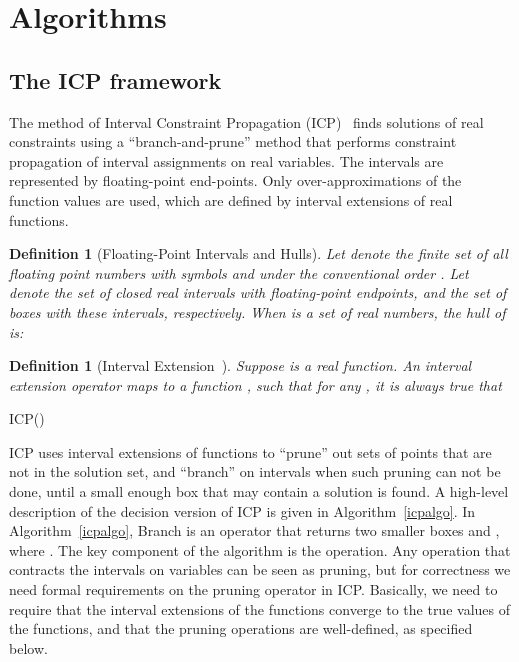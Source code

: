 \documentclass[12pt]{article}
\newtheorem{definition}[theorem]{Definition}
\begin{document}
\section{Algorithms}\label{algorithms}

\subsection{The ICP framework}

The method of Interval Constraint Propagation (ICP)~\cite{handbookICP} finds solutions of real constraints using a ``branch-and-prune'' method that performs constraint propagation of interval assignments on real variables. The intervals are represented by floating-point end-points. Only over-approximations of the function values are used, which are defined by interval extensions of real functions.
\begin{definition}[Floating-Point Intervals and Hulls]
Let  denote the finite set of all floating point numbers with symbols  and  under the conventional order . Let
 denote the set of closed real intervals with floating-point endpoints, and the set of {\em boxes} with these intervals, respectively. When  is a set of real numbers, the hull of  is:

\end{definition}
\begin{definition}[Interval Extension~\cite{handbookICP}]
Suppose  is a real function. An interval extension operator  maps  to a function , such that
for any , it is always true that 
\end{definition}
\begin{algorithm}\label{algo1}
\caption{ICP()}\label{icpalgo}
\begin{algorithmic}[1]
\Statex
    \State 
    \While{}
        \State 
        \While{}
        \State 
        \EndWhile
        \If{}
            \If{}
                \State 
                \State 
            \Else
                \State {}
            \EndIf
        \EndIf
    \EndWhile
    \State {}
\end{algorithmic}
\end{algorithm}
ICP uses interval extensions of functions to ``prune'' out sets of points that are not in the solution set, and ``branch'' on intervals when such pruning can not be done, until a small enough box that may contain a solution is found. A high-level description of the decision version of ICP is given in Algorithm~\ref{icpalgo}. In Algorithm~\ref{icpalgo}, Branch is an operator that returns two smaller boxes  and , where . The key component of the algorithm is the  operation.  Any operation that contracts the intervals on variables can be seen as pruning, but for correctness we need formal requirements on the pruning operator in ICP.  Basically, we need to require that the interval extensions of the functions converge to the true values of the functions, and that the pruning operations are well-defined, as specified below.  
\end{document}
